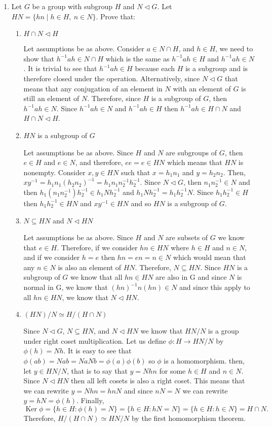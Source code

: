 \documentclass[11pt]{article}
\DeclareMathOperator{\Ker}{Ker}
\begin{document}
\begin{enumerate}

\item Let $G$ be a group with subgroup $H$ and $N \triangleleft G$.  
Let $HN = \{ hn \mid h \in H,\ n \in N\}$.  Prove that:
\begin{enumerate}
\item $H \cap N \triangleleft H$

Let assumptions be as above. Consider $a\in N\cap H$, and $h\in H$, we need to show that $h^{-1}ah\in N\cap H$ which is the same as $h^{-1}ah\in H$ and $h^{-1}ah\in N$. It is trivial to see that $h^{-1}ah\in H$ because each $H$ is a subgroup and is therefore closed under the operation. Alternatively, since $N\triangleleft G$ that means that any conjugation of an element in $N$ with an element of $G$ is still an element of $N$. Therefore, since $H$ is a subgroup of $G$, then $h^{-1}ah\in N$. Since $h^{-1}ah\in N$ and $h^{-1}ah\in H$ then $h^{-1}ah\in H\cap N$ and $H\cap N\triangleleft H$.

\item $HN$ is a subgroup of $G$

Let assumptions be as above. Since $H$ and $N$ are subgroups of $G$, then $e\in H$ and $e\in N$, and therefore, $ee = e\in HN$ which means that $HN$ is nonempty. Consider $x,y\in HN$ such that $x=h_1n_1$ and $y=h_2n_2.$ Then, $xy^{-1}=h_1n_1(h_2n_2)^{-1}=h_1n_1n_2^{-1}h_2^{-1}$. Since $N \triangleleft G$, then $n_1n_2^{-1}\in N$ and then $h_1(n_1n_2^{-1})h_2^{-1}\in h_1Nh_2^{-1}$ and $h_1Nh_2^{-1}=h_1h_2^{-1}N$. Since $h_1h_2^{-1}\in H$ then $h_1h_2^{-1}\in HN$ and $xy^{-1}\in HN$ and so $HN$ is a subgroup of $G.$

\item $N \subseteq HN$ and $N \triangleleft HN$

Let assumptions be as above. Since $H$ and $N$ are subsets of $G$ we know that $e\in H$. Therefore, if we consider $hn\in HN$ where $h\in H$ and $n\in N$, and if we consider $h = e$ then $hn = en = n\in N$ which would mean that any $n\in N$ is also an element of $HN.$ Therefore, $N\subseteq HN$. Since $HN$ is a subgroup of $G$ we know that all $hn\in HN$ are also in G and since $N$ is normal in G, we know that $(hn)^{-1}n(hn) \in N$ and since this apply to all $hn\in HN$, we know that $N\triangleleft HN$.

\item $(HN)/N \simeq H/(H \cap N)$

Since $N\triangleleft G$, $N\subseteq HN$, and $N\triangleleft HN$ we know that $HN/N$ is a group under right coset multiplication. Let us define $\phi: H \rightarrow HN/N$ by $\phi(h) = Nh.$ It is easy to see that $\phi(ab) = Nab = Na Nb = \phi(a)\phi(b)$ so $\phi$ is a homomorphism. then, let $y\in HN/N$, that is to say that $y = Nhn$ for some $h\in H$ and $n\in N$. Since $N\triangleleft HN$ then all left cosets is also a right coset. This means that we can rewrite $y = Nhn = hnN$ and since $nN = N$ we can rewrite $y = hN = \phi(h)$. Finally, $\Ker \phi = \{h\in H: \phi(h) = N\} = \{h\in H: hN = N\} = \{h\in H: h\in N\} = H\cap N.$ Therefore, $H/(H\cap N) \simeq HN/N$ by the first homomorphism theorem.


\end{enumerate}
\end{enumerate}
\end{document}
